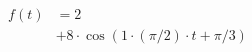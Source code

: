 \correct
\begin{center}
\begin{align*}
f(t) &= 2 \\
&+ 8 \cdot \cos( 1 \cdot (\pi/2) \cdot t + \pi/3 )
\end{align*}
\end{center}
